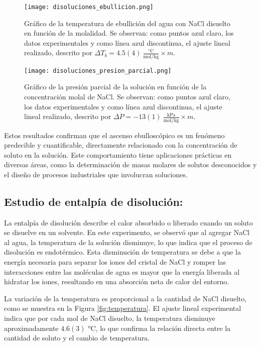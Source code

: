 \documentclass{article}
\begin{document}
\begin{figure}[H]
    \centering
    \begin{minipage}{0.45\textwidth}
        \centering
        \texttt{[image: disoluciones\_ebullicion.png]}
        \caption{Gráfico de la temperatura de ebullición del agua con NaCl disuelto en función de la molalidad. Se observan: como puntos azul claro, los datos experimentales y como línea azul discontinua, el ajuste lineal realizado, descrito por $\Delta T_b = 4.5(4) \ \frac{\text{°C}}{\text{mol/kg}} \times m$.}
        \label{fig:ebullicion}
    \end{minipage}
    \hfill
    \begin{minipage}{0.45\textwidth}
        \centering
        \texttt{[image: disoluciones\_presion\_parcial.png]}
        \caption{Gráfico de la presión parcial de la solución en función de la concentración molal de NaCl. Se observan: como puntos azul claro, los datos experimentales y como línea azul discontinua, el ajuste lineal realizado, descrito por $\Delta P = -13(1) \ \frac{\text{kPa}}{\text{mol/kg}} \times m$.}
        \label{fig:presion_parcial}
    \end{minipage}
\end{figure}

Estos resultados confirman que el ascenso ebulloscópico es un fenómeno predecible y cuantificable, directamente relacionado con la concentración de soluto en la solución. Este comportamiento tiene aplicaciones prácticas en diversas áreas, como la determinación de masas molares de solutos desconocidos y el diseño de procesos industriales que involucran soluciones.


\subsection{Estudio de entalpía de disolución:}
La entalpía de disolución describe el calor absorbido o liberado cuando un soluto se disuelve en un solvente. En este experimento, se observó que al agregar NaCl al agua, la temperatura de la solución disminuye, lo que indica que el proceso de disolución es endotérmico. Esta disminución de temperatura se debe a que la energía necesaria para separar los iones del cristal de NaCl y romper las interacciones entre las moléculas de agua es mayor que la energía liberada al hidratar los iones, resultando en una absorción neta de calor del entorno.

La variación de la temperatura es proporcional a la cantidad de NaCl disuelto, como se muestra en la Figura \ref{fig:temperatura}. El ajuste lineal experimental indica que por cada mol de NaCl disuelto, la temperatura disminuye aproximadamente $4.6(3)$ °C, lo que confirma la relación directa entre la cantidad de soluto y el cambio de temperatura.
\end{document}
